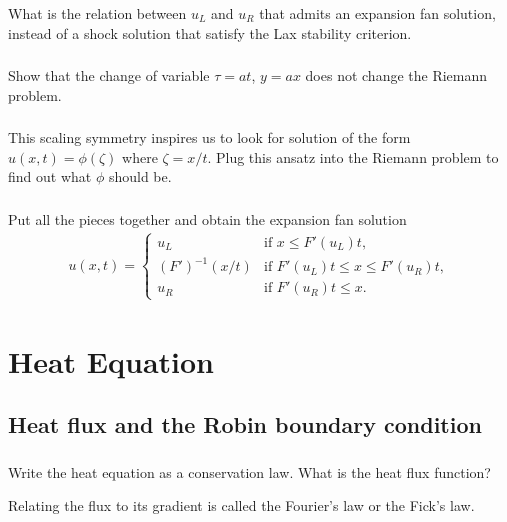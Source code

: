 \documentclass[11pt,letterpaper]{report}
\begin{document}
\subsection{}
What is the relation between $u_L$ and $u_R$ that admits an expansion fan solution, instead of a shock solution that satisfy the Lax stability criterion. 

\subsection{}
Show that the change of variable $\tau=at$, $y=ax$ does not change the Riemann problem. 

\subsection{}
This scaling symmetry inspires us to look for solution of the form $u(x,t) = \phi(\zeta)$ where $\zeta = x/t$. Plug this ansatz into the Riemann problem to find out what $\phi$ should be.

\subsection{}
Put all the pieces together and obtain the expansion fan solution
\begin{align}
    u(x,t) = \begin{cases}
        u_L &\text{if } x \leq F'(u_L) t, \\
        (F')^{-1}(x/t) &\text{if } F'(u_L) t \leq x \leq F'(u_R) t, \\
        u_R &\text{if } F'(u_R) t \leq x.
    \end{cases}
\end{align}

\chapter{Heat Equation}
\section{Heat flux and the Robin boundary condition}
\subsection{}
Write the heat equation as a conservation law. What is the heat flux function? 

Relating the flux to its gradient is called the Fourier's law or the Fick's law.
\end{document}
